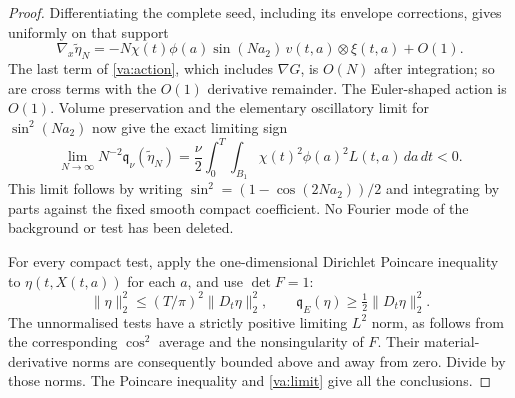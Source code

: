 \begin{proof}
Differentiating the complete seed, including its envelope corrections,
gives uniformly on that support
\[
 \nabla_x\widetilde\eta_N
 =-N\chi(t)\phi(a)\sin(Na_2)\,v(t,a)\otimes\xi(t,a)+O(1).
\]
The last term of \eqref{va:action}, which includes $\nabla G$, is $O(N)$
after integration; so are cross terms with the $O(1)$ derivative remainder.
The Euler-shaped action is $O(1)$. Volume preservation and the elementary
oscillatory limit for $\sin^2(Na_2)$ now give the exact limiting sign
\begin{equation}\label{va:limit}
 \lim_{N\to\infty}N^{-2}\mathfrak q_\nu(\widetilde\eta_N)
 =\frac\nu2\int_0^T\!\int_{B_1}\chi(t)^2\phi(a)^2 L(t,a)\,da\,dt<0.
\end{equation}
This limit follows by writing $\sin^2=(1-\cos(2Na_2))/2$ and integrating
by parts against the fixed smooth compact coefficient. No Fourier mode of
the background or test has been deleted.

For every compact test, apply the one-dimensional Dirichlet Poincare
inequality to $\eta(t,X(t,a))$ for each $a$, and use $\det F=1$:
\[
 \|\eta\|_2^2\le(T/\pi)^2\|D_t\eta\|_2^2,\qquad
 \mathfrak q_E(\eta)\ge\tfrac12\|D_t\eta\|_2^2.
\]
The unnormalised tests have a strictly positive limiting $L^2$ norm,
as follows from the corresponding $\cos^2$ average and the nonsingularity
of $F$. Their material-derivative norms are consequently bounded above
and away from zero. Divide by those norms. The Poincare inequality and
\eqref{va:limit} give all the conclusions.
\end{proof}

